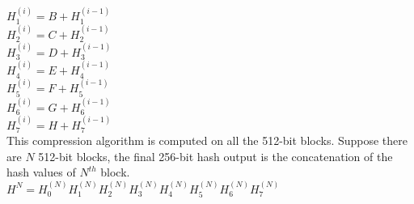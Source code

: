 \\$H_{1}^{(i)} = B + H_{1}^{(i-1)}$
\\$H_{2}^{(i)} = C + H_{2}^{(i-1)}$
\\$H_{3}^{(i)} = D + H_{3}^{(i-1)}$
\\$H_{4}^{(i)} = E + H_{4}^{(i-1)}$
\\$H_{5}^{(i)} = F + H_{5}^{(i-1)}$
\\$H_{6}^{(i)} = G + H_{6}^{(i-1)}$
\\$H_{7}^{(i)} = H + H_{7}^{(i-1)}$ \cite{FPGA}
\\This compression algorithm is computed on all the 512-bit blocks. Suppose there are $N$ 512-bit blocks, the final 256-bit hash output is the concatenation of the hash values of $N^{th}$ block.
\\$H^{N} = H_{0}^{(N)}H_{1}^{(N)}H_{2}^{(N)}H_{3}^{(N)}H_{4}^{(N)}H_{5}^{(N)}H_{6}^{(N)}H_{7}^{(N)} $ \cite{FPGA}


